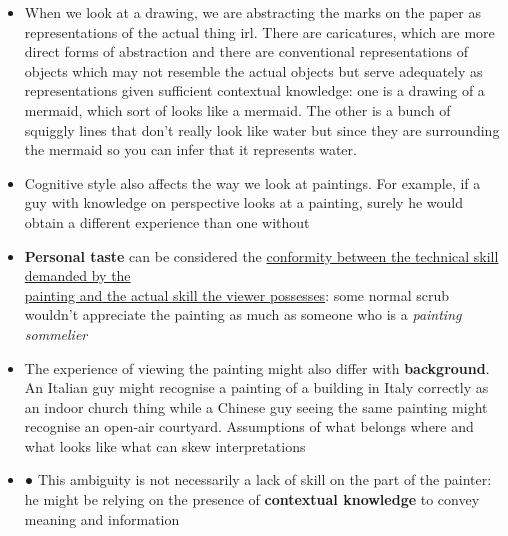 \documentclass[a4paper]{article}
\begin{document}
\begin{itemize}
	\item When we look at a drawing, we are abstracting the marks on the paper as representations of the actual thing irl. There are caricatures, which are more direct forms of abstraction and there are conventional representations of objects which may not resemble the actual objects but serve adequately as representations given sufficient contextual knowledge: one is a drawing of a mermaid, which sort of looks like a mermaid. The other is a bunch of squiggly lines that don't really look like water but since they are surrounding the mermaid so you can infer that it represents water.
	\item Cognitive style also affects the way we look at paintings. For example, if a guy with knowledge on perspective looks at a painting, surely he would obtain a different experience than one without
	\item \textbf{Personal taste} can be considered the \underline{conformity between the technical skill demanded by the}\\\underline{painting and the actual skill the viewer possesses}: some normal scrub wouldn't appreciate the painting as much as someone who is a \textit{painting sommelier}
	\item The experience of viewing the painting might also differ with \textbf{background}. An Italian guy might recognise a painting of a building in Italy correctly as an indoor church thing while a Chinese guy seeing the same painting might recognise an open-air courtyard. Assumptions of what belongs where and what looks like what can skew interpretations
	\item ●	This ambiguity is not necessarily a lack of skill on the part of the painter: he might be relying on the presence of \textbf{contextual knowledge} to convey meaning and information
\end{itemize}
\end{document}
